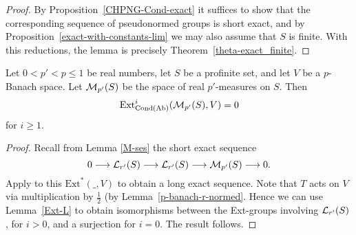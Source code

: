 \begin{proof}
  \leanok
  By Proposition~\ref{CHPNG-Cond-exact} it suffices to show
  that the corresponding sequence of pseudonormed groups is short exact,
  and by Proposition~\ref{exact-with-constants-lim} we may also assume that $S$ is finite. With this reductions, the lemma is precisely Theorem~\ref{theta-exact_finite}.
\end{proof}

\begin{theorem}
  \label{main-thm}
  \leanok
  Let $0 < p' < p \le 1$ be real numbers,
  let $S$ be a profinite set,
  and let $V$ be a $p$-Banach space.
  Let $\mathcal M_{p'}(S)$ be the space of real $p'$-measures on $S$. Then
  \[
\operatorname{Ext}^i_{\operatorname{Cond}(\operatorname{Ab})}(\mathcal M_{p'}(S),V) = 0
\]
  for $i \ge 1$.
\end{theorem}

\begin{proof}
  \leanok
  Recall from Lemma \ref{M-ses} the short exact sequence
  \[ 0 \longrightarrow \mathcal L_{r'}(S) \longrightarrow \mathcal L_{r'}(S) \longrightarrow \mathcal M_{p'}(S) \longrightarrow 0. \]
  Apply to this $\text{Ext}^*(\_, V)$ to obtain a long exact sequence.
  Note that $T$ acts on $V$ via multiplication by $\tfrac12$ (by Lemma~\ref{p-banach-r-normed}.
  Hence we can use Lemma~\ref{Ext-L} to obtain isomorphisms between the Ext-groups involving $\mathcal L_{r'}(S)$, for $i > 0$,
  and a surjection for $i = 0$.
  The result follows.
\end{proof}

